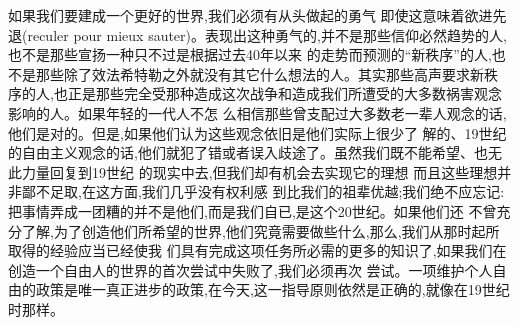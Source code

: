 ﻿\documentclass[12pt]{article}
\begin{document}
如果我们要建成一个更好的世界,我们必须有从头做起的勇气 \myrule 即使这意味着欲进先退(reculer pour
mieux sauter)。表现出这种勇气的,并不是那些信仰必然趋势的人,也不是那些宣扬一种只不过是根据过去40年以来
的走势而预测的``新秩序''的人,也不是那些除了效法希特勒之外就没有其它什么想法的人。其实那些高声要求新秩
序的人,也正是那些完全受那种造成这次战争和造成我们所遭受的大多数祸害观念影响的人。如果年轻的一代人不怎
么相信那些曾支配过大多数老一辈人观念的话,他们是对的。但是,如果他们认为这些观念依旧是他们实际上很少了
解的、19世纪的自由主义观念的话,他们就犯了错或者误入歧途了。虽然我们既不能希望、也无此力量回复到19世纪
的现实中去,但我们却有机会去实现它的理想 \myrule 而且这些理想并非鄙不足取,在这方面,我们几乎没有权利感
到比我们的祖辈优越;我们绝不应忘记:把事情弄成一团糟的并不是他们,而是我们自已,是这个20世纪。如果他们还
不曾充分了解,为了创造他们所希望的世界,他们究竟需要做些什么,那么,我们从那时起所取得的经验应当已经使我
们具有完成这项任务所必需的更多的知识了,如果我们在创造一个自由人的世界的首次尝试中失败了,我们必须再次
尝试。一项维护个人自由的政策是唯一真正进步的政策,在今天,这一指导原则依然是正确的,就像在19世纪时那样。
\end{document}

